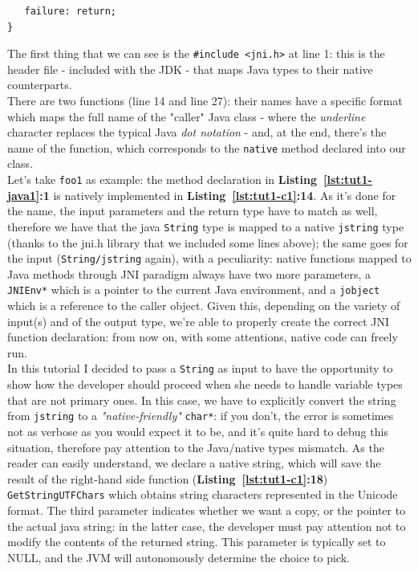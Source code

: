 \documentclass[a4paper,10pt]{article}
\newcommand{\keyword}[1]{\texttt{#1}}
\newcommand{\refl}[1]{\textbf{Listing~\ref{#1}}}
\begin{document}
\begin{multicols}{2}
\begin{lstlisting}
   failure: return;
}
\end{lstlisting}
The first thing that we can see is the \keyword{\#include <jni.h>} at line 1: this is the header file - included with the JDK - that maps Java types to their native counterparts.\\
There are two functions (line 14 and line 27): their names have a specific format which maps the full name of the "caller" Java class - where the \textit{underline} character replaces the typical Java \textit{dot notation} - and, at the end, there's the name of the function, which corresponds to the \keyword{native} method declared into our class.\\
Let's take \keyword{foo1} as example: the method declaration in \refl{lst:tut1-java1}\textbf{:1} is natively implemented in \refl{lst:tut1-c1}\textbf{:14}. As it's done for the name, the input parameters and the return type have to match as well, therefore we have that the java \keyword{String} type is mapped to a native \keyword{jstring} type (thanks to the jni.h library that we included some lines above); the same goes for the input (\keyword{String/jstring} again), with a peculiarity: native functions mapped to Java methods through JNI paradigm always have two more parameters, a \keyword{JNIEnv*} which is a pointer to the current Java environment, and a \keyword{jobject} which is a reference to the caller object. Given this, depending on the variety of input(s) and of the output type, we're able to properly create the correct JNI function declaration: from now on, with some attentions, native code can freely run.\\
In this tutorial I decided to pass a \keyword{String} as input to have the opportunity to show how the developer should proceed when she needs to handle variable types that are not primary ones. In this case, we have to explicitly convert the string from \keyword{jstring} to a \textit{"native-friendly"} \keyword{char*}: if you don't, the error is sometimes not as verbose as you would expect it to be, and it's quite hard to debug this situation, therefore pay attention to the Java/native types mismatch. As the reader can easily understand, we declare a native string, which will save the result of the right-hand side function (\refl{lst:tut1-c1}\textbf{:18}) \keyword{GetStringUTFChars} which obtains string characters represented in the Unicode format. The third parameter indicates whether we want a copy, or the pointer to the actual java string: in the latter case, the developer must pay attention not to modify the contents of the returned string. This parameter is typically set to NULL, and the JVM will autonomously determine the choice to pick.\\

\end{multicols}
\end{document}
